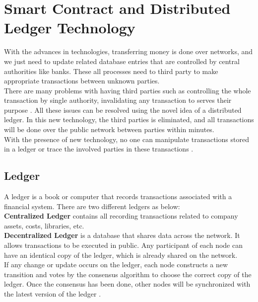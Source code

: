 \chapter{Smart Contract and Distributed Ledger Technology}
With the advances in technologies, transferring money is done over networks, and we just need to update related database entries that are controlled by central authorities like banks. These all processes need to third party to make appropriate transactions between unknown parties. \\
There are many problems with having third parties such as controlling the whole transaction by single authority, invalidating any transaction to serves their purpose . All these issues can be resolved using the novel idea of a distributed ledger. In this new technology, the third parties is eliminated, and all transactions will be done over the public network between parties within minutes. \\
With the presence of new technology, no one can manipulate transactions stored in a ledger or trace the involved parties in these transactions \cite {Masood}. 
\section{Ledger} 
A ledger is a book or computer that records transactions associated with a financial system. There are two different ledgers as below: \\
\textbf{Centralized Ledger} contains all recording transactions related to company assets, costs, libraries, etc. \\
\textbf{Decentralized Ledger} is a database that shares data across the network. It allows transactions to be executed in public. Any participant of each node can have an identical copy of the ledger, which is already shared on the network.\\
If any change or update occurs on the ledger, each node constructs a new transition and votes by the consensus algorithm to choose the correct copy of the ledger. Once the consensus has been done, other nodes will be synchronized with the latest version of the ledger \cite{Markos}.

